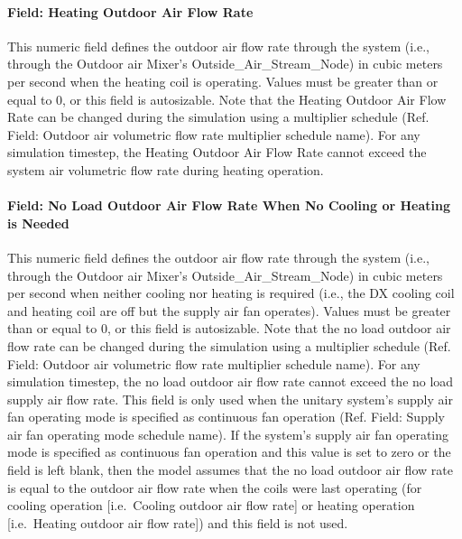 \paragraph{Field: Heating Outdoor Air Flow Rate}\label{field-heating-outdoor-air-flow-rate-000}

This numeric field defines the outdoor air flow rate through the system (i.e., through the Outdoor air Mixer's Outside\_Air\_Stream\_Node) in cubic meters per second when the heating coil is operating. Values must be greater than or equal to 0, or this field is autosizable. Note that the Heating Outdoor Air Flow Rate can be changed during the simulation using a multiplier schedule (Ref. Field: Outdoor air volumetric flow rate multiplier schedule name). For any simulation timestep, the Heating Outdoor Air Flow Rate cannot exceed the system air volumetric flow rate during heating operation.

\paragraph{Field: No Load Outdoor Air Flow Rate When No Cooling or Heating is Needed}\label{field-no-load-outdoor-air-flow-rate-when-no-cooling-or-heating-is-needed}

This numeric field defines the outdoor air flow rate through the system (i.e., through the Outdoor air Mixer's Outside\_Air\_Stream\_Node) in cubic meters per second when neither cooling nor heating is required (i.e., the DX cooling coil and heating coil are off but the supply air fan operates). Values must be greater than or equal to 0, or this field is autosizable. Note that the no load outdoor air flow rate can be changed during the simulation using a multiplier schedule (Ref. Field: Outdoor air volumetric flow rate multiplier schedule name). For any simulation timestep, the no load outdoor air flow rate cannot exceed the no load supply air flow rate. This field is only used when the unitary system's supply air fan operating mode is specified as continuous fan operation (Ref. Field: Supply air fan operating mode schedule name). If the system's supply air fan operating mode is specified as continuous fan operation and this value is set to zero or the field is left blank, then the model assumes that the no load outdoor air flow rate is equal to the outdoor air flow rate when the coils were last operating (for cooling operation {[}i.e.~Cooling outdoor air flow rate{]} or heating operation {[}i.e.~Heating outdoor air flow rate{]}) and this field is not used.

